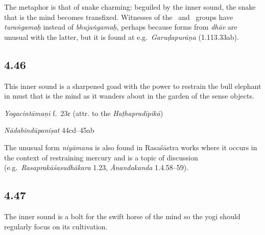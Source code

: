 \begin{ekdosis}
\begin{philcomm}[hp04_045]
The metaphor is that of snake charming: beguiled by the inner sound, the snake that is the mind becomes transfixed. Witnesses of the \gamma \ and \delta \ groups have \emph{turaṅgamaḥ} instead of \emph{bhujaṅgamaḥ}, perhaps because forms from \emph{dhāv} are unusual with the latter, but it is found at e.g.~\emph{Garuḍapurāṇa} (1.113.33ab). 
\end{philcomm}

\subsection*{4.46}
\begin{translation}[hp04_046]
This inner sound is a sharpened goad with the power to restrain the bull elephant in must that is the mind as it wanders about in the garden of the sense objects.
\end{translation} %


\begin{testimonia}[hp04_046]
\emph{Yogacintāmaṇi} f.~23r (attr. to the \emph{Haṭhapradīpikā})
\begin{versinnote}
\end{versinnote}

\emph{Nādabindūpaniṣat} 44cd–45ab
\begin{versinnote}
\end{versinnote}
\end{testimonia}

\begin{philcomm}[hp04_046]
The unusual form \emph{niyāmana} is also found in Rasaśāstra works where it occurs in the context of restraining mercury and is a topic of discussion (e.g.~\emph{Rasaprakāśasudhākara} 1.23, \emph{Ānandakanda} 1.4.58–59).
\end{philcomm}


\subsection*{4.47}
\begin{translation}[hp04_047]
The inner sound is a bolt for the swift horse of the mind so the yogi should regularly focus on its cultivation.
\end{translation} 


\end{ekdosis}
